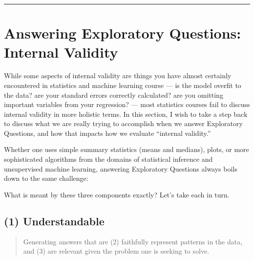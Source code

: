 \documentclass[letterpaper,10pt,english]{jupyterBook}
\begin{document}
\bigskip\hrule\bigskip


\sphinxstepscope


\chapter{Answering Exploratory Questions: Internal Validity}
\label{\detokenize{30_questions/16_exploratory_internal_challenges:answering-exploratory-questions-internal-validity}}\label{\detokenize{30_questions/16_exploratory_internal_challenges::doc}}
\sphinxAtStartPar
While some aspects of internal validity are things you have almost certainly encountered in statistics and machine learning course — is the model overfit to the data? are your standard errors correctly calculated? are you omitting important variables from your regression? — most statistics courses fail to discuss internal validity in more holistic terms. In this section, I wish to take a step back to discuss what we are really trying to accomplish when we answer Exploratory Questions, and how that impacts how we evaluate “internal validity.”

\sphinxAtStartPar
Whether one uses simple summary statistics (means and medians), plots, or more sophisticated algorithms from the domains of statistical inference and unsupervised machine learning, answering Exploratory Questions always boils down to the same challenge:

\sphinxAtStartPar
{}

\sphinxAtStartPar
What is meant by these three components exactly? Let’s take each in turn.















\sphinxstepscope


\section{(1) Understandable}
\label{\detokenize{30_questions/17_exploratory_internal_understandable:understandable}}\label{\detokenize{30_questions/17_exploratory_internal_understandable::doc}}\begin{quote}

\sphinxAtStartPar
Generating answers that are  (2) faithfully represent patterns in the data, and (3) are relevant given the problem one is seeking to solve.
\end{quote}
\end{document}
